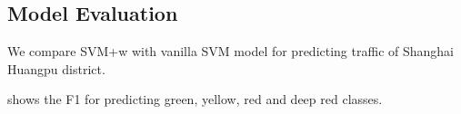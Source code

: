 %

\subsection{Model Evaluation}


We compare 
SVM+w with vanilla SVM model for predicting traffic of Shanghai 
Huangpu district. 

 shows the F1 for predicting
green, yellow, red and deep red classes. 

